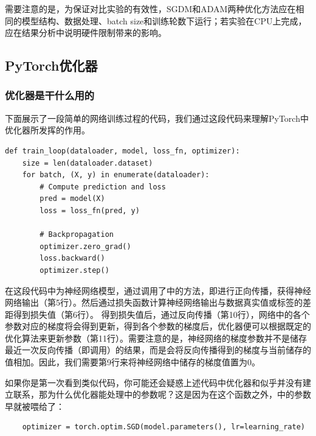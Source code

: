 需要注意的是，为保证对比实验的有效性，SGDM和ADAM两种优化方法应在相同的模型结构、数据处理、batch size和训练轮数下运行；若实验在CPU上完成，应在结果分析中说明硬件限制带来的影响。

\subsection{PyTorch优化器}

\subsubsection{优化器是干什么用的}

下面展示了一段简单的网络训练过程的代码，我们通过这段代码来理解PyTorch中优化器所发挥的作用。

\begin{lstlisting}
def train_loop(dataloader, model, loss_fn, optimizer):
    size = len(dataloader.dataset)
    for batch, (X, y) in enumerate(dataloader):
        # Compute prediction and loss
        pred = model(X)
        loss = loss_fn(pred, y)
        
        # Backpropagation
        optimizer.zero_grad()
        loss.backward()
        optimizer.step()
\end{lstlisting}
    
在这段代码中为神经网络模型，通过调用了中的方法，即进行正向传播，获得神经网络输出（第5行）。然后通过损失函数计算神经网络输出与数据真实值或标签的差距得到损失值（第6行）。
得到损失值后，通过反向传播（第10行），网络中的各个参数对应的梯度将会得到更新，得到各个参数的梯度后，优化器便可以根据既定的优化算法来更新参数（第11行）。需要注意的是，神经网络的梯度参数并不是储存最近一次反向传播（即调用）的结果，而是会将反向传播得到的梯度与当前储存的值相加。因此，我们需要第9行来将神经网络中储存的梯度值置为0。

如果你是第一次看到类似代码，你可能还会疑惑上述代码中优化器和似乎并没有建立联系，那为什么优化器能处理中的参数呢？这是因为在这个函数之外，中的参数早就被喂给了：
\begin{lstlisting}
    optimizer = torch.optim.SGD(model.parameters(), lr=learning_rate)
\end{lstlisting}

